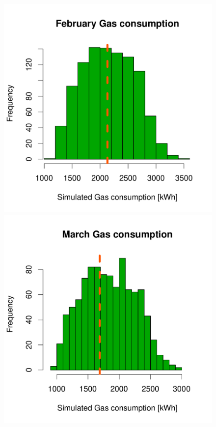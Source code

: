 \documentclass[a4paper, 12pt]{article}
\begin{document}
\begin{figure}
 \includegraphics[width=\scale]{Simulation_histograms/Batch_2_Only/February_Gas}
 \includegraphics[width=\scale]{Simulation_histograms/Batch_2_Only/March_Gas}\\

\end{figure}
\end{document}
